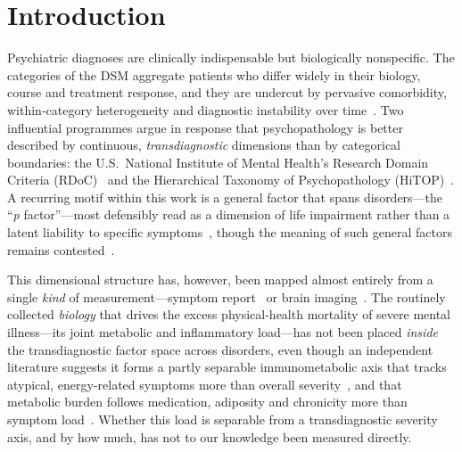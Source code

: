 \section{Introduction}

Psychiatric diagnoses are clinically indispensable but biologically nonspecific. The
categories of the DSM aggregate patients who differ widely in their biology, course and
treatment response, and they are undercut by pervasive comorbidity, within-category
heterogeneity and diagnostic instability over time~\citep{insel2010rdoc,kotov2017hitop}.
Two influential programmes argue in response that psychopathology is better described by
continuous, \emph{transdiagnostic} dimensions than by categorical boundaries: the U.S.\
National Institute of Mental Health's Research Domain Criteria (RDoC)~\citep{insel2010rdoc}
and the Hierarchical Taxonomy of Psychopathology
(HiTOP)~\citep{kotov2017hitop,ruggero2019hitop}. A recurring motif within this work is a
general factor that spans disorders---the ``\textit{p} factor''---most defensibly read as a
dimension of life impairment rather than a latent liability to specific
symptoms~\citep{caspi2014pfactor,lahey2017general}, though the meaning of such general
factors remains contested~\citep{heinrich2021bifactor,watts2021}.

This dimensional structure has, however, been mapped almost entirely from a single
\emph{kind} of measurement---symptom report~\citep{caspi2014pfactor,kotov2017hitop} or
brain imaging~\citep{marquand2016,wolfers2018,segal2023}. The routinely collected
\emph{biology} that drives the excess physical-health mortality of severe mental
illness---its joint metabolic and inflammatory load---has not been placed \emph{inside} the
transdiagnostic factor space across disorders, even though an independent literature
suggests it forms a partly separable immunometabolic axis that tracks atypical,
energy-related symptoms more than overall
severity~\citep{penninx2024imd,milaneschi2020,lamers2020}, and that metabolic burden
follows medication, adiposity and chronicity more than symptom
load~\citep{vancampfort2015mets,pillinger2017,perry2019}. Whether this load is separable
from a transdiagnostic severity axis, and by how much, has not to our knowledge been
measured directly.

